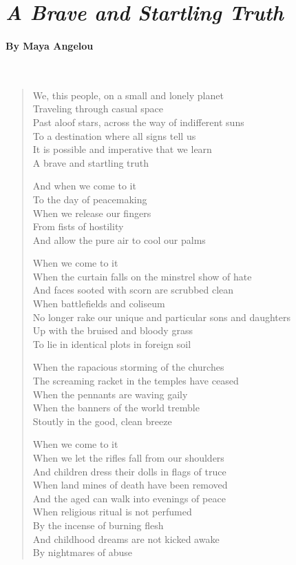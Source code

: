 \documentclass[12pt, openany, letterpaper]{memoir}
\begin{document}
\newpage
{}
\section*{\emph{A Brave and Startling Truth}}
\paragraph{By Maya Angelou}~
\begin{verse}
	We, this people, on a small and lonely planet\\
	Traveling through casual space\\
	Past aloof stars, across the way of indifferent suns\\
	To a destination where all signs tell us\\
	It is possible and imperative that we learn\\
	A brave and startling truth
	
	And when we come to it\\
	To the day of peacemaking\\
	When we release our fingers\\
	From fists of hostility\\
	And allow the pure air to cool our palms
	
	When we come to it\\
	When the curtain falls on the minstrel show of hate\\
	And faces sooted with scorn are scrubbed clean\\
	When battlefields and coliseum\\
	No longer rake our unique and particular sons and daughters\\
	Up with the bruised and bloody grass\\
	To lie in identical plots in foreign soil
	
	When the rapacious storming of the churches\\
	The screaming racket in the temples have ceased\\
	When the pennants are waving gaily\\
	When the banners of the world tremble\\
	Stoutly in the good, clean breeze
	
	When we come to it\\
	When we let the rifles fall from our shoulders\\
	And children dress their dolls in flags of truce\\
	When land mines of death have been removed\\
	And the aged can walk into evenings of peace\\
	When religious ritual is not perfumed\\
	By the incense of burning flesh\\
	And childhood dreams are not kicked awake\\
	By nightmares of abuse
	

\end{verse}
\end{document}
